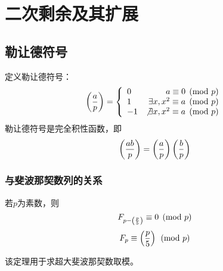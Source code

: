 \section{二次剩余及其扩展}
\subsection{勒让德符号}
定义勒让德符号：
\begin{displaymath}
	\left(\frac{a}{p}\right)=
	\left\{\begin{array}{lr}
		0  & a\equiv 0 \pmod{p}                  \\
		1  & \exists x,x^2\equiv a \pmod{p}      \\
		-1 & \not \exists x,x^2\equiv a \pmod{p}
	\end{array}\right.
\end{displaymath}
勒让德符号是完全积性函数，即
\begin{displaymath}
	\left(\frac{ab}{p}\right)=\left(\frac{a}{p}\right)\left(\frac{b}{p}\right)
\end{displaymath}
\subsubsection{与斐波那契数列的关系}
\begin{theorem}
	若$p$为素数，则
	\begin{displaymath}
		F_{p-\left(\frac{p}{5}\right)}\equiv 0 \pmod{p}
	\end{displaymath}
	\begin{displaymath}
		F_p\equiv \left(\frac{p}{5}\right) \pmod{p}
	\end{displaymath}
\end{theorem}
该定理用于求超大斐波那契数取模。
